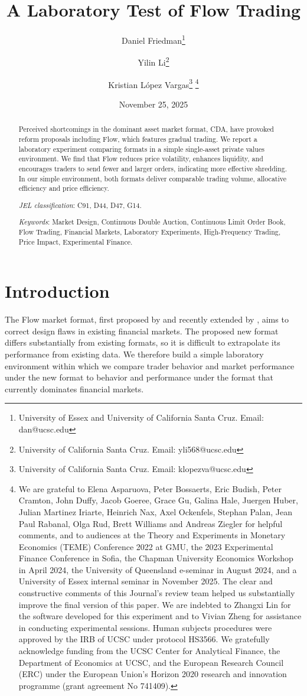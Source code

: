 \documentclass[12pt]{article}
\title{A Laboratory Test of Flow Trading}
\author{
  Daniel Friedman\thanks{
  University of Essex and University of California Santa Cruz. Email: dan@ucsc.edu} 
\and
  Yilin Li\thanks{
  University of California Santa Cruz. Email: yli568@ucsc.edu} 
\and
  Kristian L\'opez Vargas\thanks{
  University of California Santa Cruz. Email: klopezva@ucsc.edu}
  \thanks{
We are grateful to Elena Asparuova, Peter Bossaerts, Eric Budish, Peter Cramton, John Duffy,  Jacob Goeree, Grace Gu, Galina Hale, Juergen Huber, Julian Martinez Iriarte, Heinrich Nax, Axel Ockenfels, Stephan Palan,  Jean Paul Rabanal, Olga Rud, Brett Williams and  Andreas Ziegler
for helpful comments,  
and to audiences at the Theory and Experiments in Monetary Economics (TEME) Conference 2022 at GMU, the 2023 Experimental Finance Conference in Sofia, the Chapman University Economics Workshop in April 2024, the University of Queensland e-seminar in August 2024, and a University of Essex internal seminar in November 2025.
The clear and constructive comments of this Journal's review team helped us substantially improve the final version of this paper.
We are indebted to Zhangxi Lin for the software developed for this experiment and to Vivian Zheng for assistance in conducting experimental sessions. 
Human subjects procedures were approved by the IRB of UCSC under protocol HS3566. 
We gratefully acknowledge funding from the UCSC Center for Analytical Finance, the Department of Economics at UCSC, and the European Research Council (ERC) under the European Union’s Horizon 2020 research and innovation programme (grant agreement No 741409).}
}
\date{November 25, 2025}
\begin{document}
\maketitle

\vspace{-.4in}
\begin{abstract}
\begin{singlespace}
Perceived shortcomings in the dominant asset market format, CDA, have provoked reform proposals including Flow, which features gradual trading. 
We report a laboratory experiment comparing formats in a simple single-asset private values environment. 
We find that Flow reduces price volatility, enhances liquidity, and encourages traders to send fewer and larger orders, indicating more effective shredding. 
In our simple environment, both formats deliver comparable trading volume, allocative efficiency and price efficiency. 

\bigskip

\noindent\textit{JEL classification}: C91, D44, D47, G14.

\noindent \textit{Keywords}: Market Design, Continuous Double Auction, Continuous Limit Order Book, Flow Trading, Financial Markets, Laboratory Experiments, High-Frequency Trading, Price Impact, Experimental Finance.

\end{singlespace}
\end{abstract}




\newpage
\setcounter{page}{1}
\section*{Introduction} \label{introduction}

The Flow market format, first proposed by \cite{Kyle2017} and recently extended by \cite{Budish2023}, aims to 
correct design flaws in existing financial markets. 
The proposed new format differs substantially from existing formats,
so it is difficult to extrapolate its performance from existing data. 
We therefore build a simple laboratory environment within which we compare trader behavior and market performance under the new format to behavior and performance under the format that currently dominates financial markets.
\end{document}
